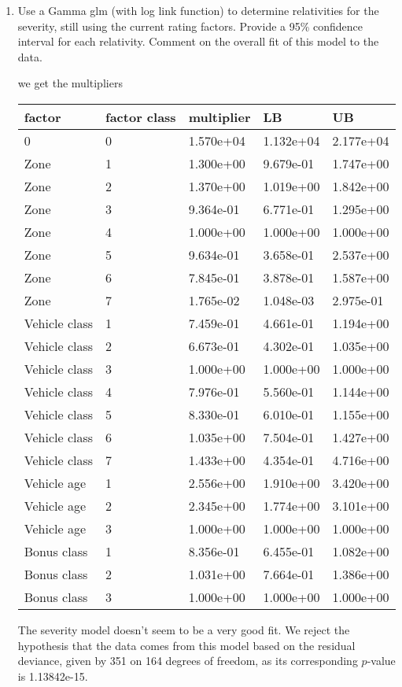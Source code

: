 \documentclass[11pt]{article}
\begin{document}
\begin{enumerate}
\item Use a Gamma glm (with log link function) to determine relativities for the severity, still using the current rating factors.
Provide a 95\% confidence interval for each relativity. Comment on the overall fit of this model to the data.

 we get the multipliers

\begin{tabular}{lllll}
\hline
factor & factor class & multiplier & LB & UB\\
\hline
0&0&1.570e+04&1.132e+04&2.177e+04\\
Zone&1&1.300e+00&9.679e-01&1.747e+00\\
Zone&2&1.370e+00&1.019e+00&1.842e+00\\
Zone&3&9.364e-01&6.771e-01&1.295e+00\\
Zone&4&1.000e+00&1.000e+00&1.000e+00\\
Zone&5&9.634e-01&3.658e-01&2.537e+00\\
Zone&6&7.845e-01&3.878e-01&1.587e+00\\
Zone&7&1.765e-02&1.048e-03&2.975e-01\\
Vehicle class&1&7.459e-01&4.661e-01&1.194e+00\\
Vehicle class&2&6.673e-01&4.302e-01&1.035e+00\\
Vehicle class&3&1.000e+00&1.000e+00&1.000e+00\\
Vehicle class&4&7.976e-01&5.560e-01&1.144e+00\\
Vehicle class&5&8.330e-01&6.010e-01&1.155e+00\\
Vehicle class&6&1.035e+00&7.504e-01&1.427e+00\\
Vehicle class&7&1.433e+00&4.354e-01&4.716e+00\\
Vehicle age&1&2.556e+00&1.910e+00&3.420e+00\\
Vehicle age&2&2.345e+00&1.774e+00&3.101e+00\\
Vehicle age&3&1.000e+00&1.000e+00&1.000e+00\\
Bonus class&1&8.356e-01&6.455e-01&1.082e+00\\
Bonus class&2&1.031e+00&7.664e-01&1.386e+00\\
Bonus class&3&1.000e+00&1.000e+00&1.000e+00\\
\hline
\end{tabular}

The severity model doesn't seem to be a very good fit. We reject the hypothesis that the data comes from this model based on the residual deviance, given by 351 on 164 degrees of freedom, as its corresponding $p$-value is 1.13842e-15.


\end{enumerate}
\end{document}
